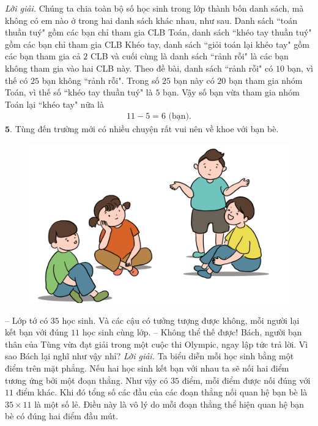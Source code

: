 \begin{multicols}{2}
\begin{figure}[H]
		\vspace*{-15pt}
	\end{figure}
	\textit{Lời giải.} 	Chúng ta chia toàn bộ số học sinh trong lớp thành bốn danh sách, mà không có em nào ở trong hai danh sách khác nhau, như sau. Danh sách ``toán thuần tuý" gồm các bạn chỉ tham gia CLB Toán, danh sách ``khéo tay thuần tuý" gồm các bạn chỉ tham gia CLB Khéo tay, danh sách ``giỏi toán lại khéo tay" gồm các bạn tham gia cả $2$ CLB  và cuối cùng là danh sách ``rảnh rỗi" là các bạn không tham gia vào hai CLB này. Theo đề bài, danh sách ``rảnh rỗi" có $10$ bạn, vì thế có $25$ bạn không ``rảnh rỗi". Trong số $25$ bạn này có $20$ bạn tham gia nhóm Toán, vì thế số ``khéo tay thuần tuý" là $5$ bạn. Vậy số bạn vừa tham gia nhóm Toán lại ``khéo tay" nữa là 
	\begin{align*}
		11-5 = 6 \text{ (bạn).}
	\end{align*}
	$\pmb{5.}$ Tùng đến trường mới có nhiều chuyện rất vui nên về khoe với bạn bè.
	\begin{figure}[H]
		\centering
		\captionsetup{labelformat= empty, justification=centering}
		\includegraphics[width=1\linewidth]{Pi10_ToanBi_Bai5}
		\vspace*{-15pt}
	\end{figure}
	-- Lớp tớ có $35$ học sinh. Và các cậu có tưởng tượng được không, mỗi người lại kết bạn với đúng $11$ học sinh cùng lớp.
	\vskip 0.1cm
	-- Không thể thế được! Bách, người bạn thân của Tùng vừa đạt giải trong một cuộc thi Olympic, ngay lập tức trả lời.
	\vskip 0.1cm
	Vì sao Bách lại nghĩ như vậy nhỉ?
	\vskip 0.1cm
	\textit{Lời giải.} 	Ta biểu diễn mỗi học sinh bằng một điểm trên mặt phẳng. Nếu hai học sinh kết bạn với nhau ta sẽ nối hai điểm tương ứng bởi một đoạn thẳng. Như vậy có $35$ điểm, mỗi điểm được nối đúng với $11$ điểm khác. Khi đó tổng số các đầu của các đoạn thẳng nối quan hệ bạn bè là $35\times11$ là một số lẻ. Điều này là vô lý do mỗi đoạn thẳng thể hiện quan hệ bạn bè có đúng hai điểm đầu mút. 

\end{multicols}
